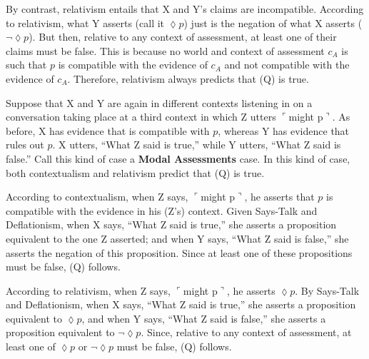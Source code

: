 \documentclass[11pt]{article}
\newcommand{\ul}{$\ulcorner$}
\newcommand{\urn}{$\urcorner$}
\begin{document}
\begin{doublespace}
By contrast, relativism entails that X and Y's claims are incompatible. According to relativism, what Y asserts (call it $\lozenge p$) just is the negation of what X asserts ($\lnot\lozenge p$). But then, relative to any context of assessment, at least one of their claims must be false. This is because no world and context of assessment $c_A$ is such that $p$ is compatible with the evidence of $c_A$ and not  compatible with the evidence of $c_A$. Therefore, relativism always predicts that (Q) is true.\\ 


\noindent Suppose that X and Y are again in different contexts listening in on a conversation taking place at a third context in which Z utters \ul might p\urn. As before, X has evidence that is compatible with $p$, whereas Y has evidence that rules out $p$. X utters, ``What Z said is true,'' while Y utters, ``What Z said is false.'' Call this kind of case a {\bf Modal Assessments} case. In this kind of case, both contextualism and relativism predict that (Q) is true. %



According to contextualism, when Z says, \ul might p\urn, he asserts that $p$ is compatible with the evidence in his (Z's) context. Given {\sc Says-Talk} and {\sc Deflationism}, when X says, ``What Z said is true,'' she asserts a proposition equivalent to the one  Z asserted; and when Y says, ``What Z said is false,'' she asserts the negation of this proposition. Since at least one of these propositions must be false, (Q) follows.

According to relativism, when Z says, \ul might p\urn, he asserts $\lozenge p$. By {\sc Says-Talk} and {\sc Deflationism}, when X says, ``What Z said is true,'' she asserts a proposition equivalent to $\lozenge p$, and when Y says, ``What Z said is false,'' she asserts a proposition equivalent to $\lnot\lozenge p$. Since, relative to any context of assessment, at least one of $\lozenge p$ or $\lnot\lozenge p$ must be false, (Q) follows.%


\end{doublespace}
\end{document}
